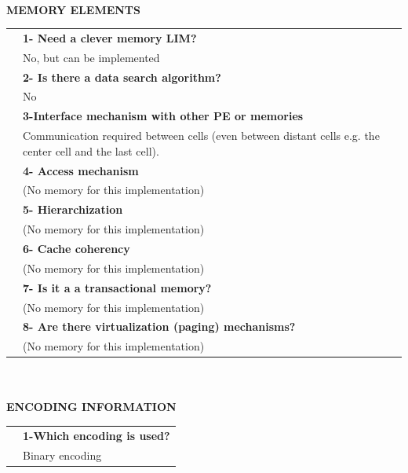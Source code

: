 \clearpage
{\large \textbf{\qquad }}\vspace{10pt}\\
{\large \textbf{MEMORY ELEMENTS}}\vspace{10pt}\\\begin{tabular}{ p{0.2cm} p{14.5cm}}
&\textbf{1- Need a clever memory LIM?}\\
&	No, but can be implemented\vspace{7pt}\\
&\textbf{2- Is there a data search algorithm?}\\
&	No\vspace{7pt}\\
&\textbf{	3-Interface mechanism with other PE or memories}\\
&	Communication required between cells (even between distant cells e.g. the center cell and the last cell).\vspace{7pt}\\
&	\textbf{4- Access mechanism}\\
&	(No memory for this implementation)\vspace{7pt}\\
&	\textbf{5- Hierarchization} \\
&	(No memory for this implementation)\vspace{7pt}\\
&\textbf{	6- Cache coherency} \\
&	(No memory for this implementation)\vspace{7pt}\\
&\textbf{	7- Is it a a transactional memory?}\\
&	(No memory for this implementation)\vspace{7pt}\\
&\textbf{	8- Are there virtualization (paging) mechanisms?}\\
&	(No memory for this implementation)\end{tabular}\vspace{14pt}\\
\vspace{10pt}\\
{\large\textbf{ENCODING INFORMATION}}\vspace{10pt}\\
\begin{tabular}{ p{0.2cm} p{14.5cm}}
	&\textbf{1-Which encoding is used?}\\
	&Binary encoding
\end{tabular}
